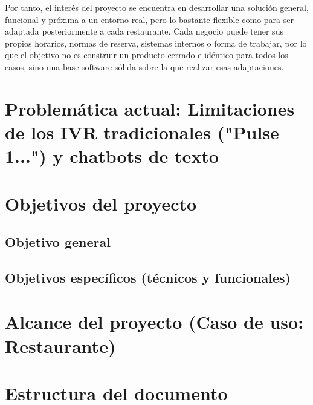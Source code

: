 Por tanto, el interés del proyecto se encuentra en desarrollar una solución general, funcional y próxima a un entorno real, pero lo bastante flexible como para ser adaptada posteriormente a cada restaurante. Cada negocio puede tener sus propios horarios, normas de reserva, sistemas internos o forma de trabajar, por lo que el objetivo no es construir un producto cerrado e idéntico para todos los casos, sino una base software sólida sobre la que realizar esas adaptaciones.

\section{Problemática actual: Limitaciones de los IVR tradicionales ("Pulse 1...") y chatbots de texto}
\label{sec:problematica_actual}

\textoBase

\textoBaseAlt

\section{Objetivos del proyecto}
\label{sec:objetivos_proyecto}

\textoBase

\subsection{Objetivo general}
\label{subsec:objetivo_general}

\textoBaseAlt

\subsection{Objetivos específicos (técnicos y funcionales)}
\label{subsec:objetivos_especificos}

\textoBase

\section{Alcance del proyecto (Caso de uso: Restaurante)}
\label{sec:alcance_proyecto}

\textoBase

\textoBaseAlt

\section{Estructura del documento}
\label{sec:estructura_documento}

\textoBase